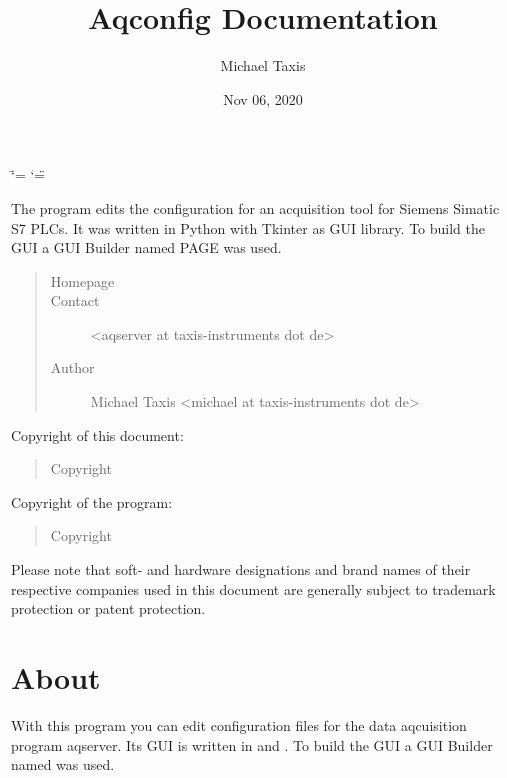 \documentclass[a4paper,10pt,english]{sphinxmanual}
\title{Aqconfig Documentation}
\date{Nov 06, 2020}
\author{Michael Taxis}
\begin{document}
\ifdefined\shorthandoff
  \ifnum\catcode`\=\string=\active\shorthandoff{=}\fi
  \ifnum\catcode`\"=\active{}\fi
\fi

\pagestyle{empty}
\sphinxmaketitle
\pagestyle{plain}
\sphinxtableofcontents
\pagestyle{normal}
\label{\detokenize{index::doc}}


The program edits the configuration for an acquisition tool for Siemens Simatic S7 PLCs.
It was written in Python with Tkinter as GUI library.
To build the GUI a GUI Builder named PAGE was used.
\begin{quote}\begin{description}
\item[{Homepage}] \leavevmode
{}

\item[{Contact}] \leavevmode
\textless{}aqserver at taxis-instruments dot de\textgreater{}

\item[{Author}] \leavevmode
Michael Taxis \textless{}michael at taxis-instruments dot de\textgreater{}

\end{description}\end{quote}

Copyright of this document:
\begin{quote}\begin{description}
\item[{Copyright}] \leavevmode
{}

\end{description}\end{quote}

Copyright of the program:
\begin{quote}\begin{description}
\item[{Copyright}] \leavevmode
{}

\end{description}\end{quote}

Please note that soft- and hardware designations and brand names of their respective companies  used in this document are  generally subject to trademark protection or patent protection.


\chapter{About}
\label{\detokenize{about:about}}\label{\detokenize{about::doc}}
With this program you can edit configuration files for the data aqcuisition program aqserver.
Its GUI is written in  and .
To build the GUI a GUI Builder named  was used.
\end{document}
